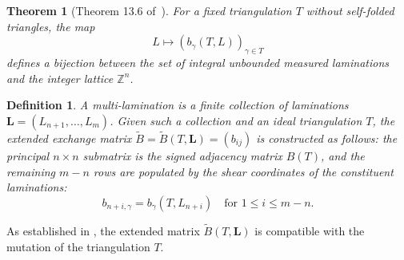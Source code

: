 \documentclass{article}
\newtheorem{definition}{Definition}
\newtheorem{theorem}{Theorem}
\theoremstyle{remark}
\begin{document}
\begin{theorem}[Theorem 13.6 of~\cite{FT-II}]
For a fixed triangulation $T$ without self-folded triangles, the map 
\[ L \mapsto (b_{\gamma}(T, L))_{\gamma \in T} \]
defines a bijection between the set of integral unbounded measured laminations and the integer lattice $\mathbb{Z}^n$.
\end{theorem}

\begin{definition}
A \emph{multi-lamination} is a finite collection of laminations $\mathbf{L} = (L_{n+1}, \ldots, L_{m})$. Given such a collection and an ideal triangulation $T$, the extended exchange matrix $\tilde{B} = \tilde{B}(T, \mathbf{L}) = (b_{ij})$ is constructed as follows: the principal $n \times n$ submatrix is the signed adjacency matrix $B(T)$, and the remaining $m-n$ rows are populated by the shear coordinates of the constituent laminations:
\[
b_{n+i, \gamma} = b_{\gamma}(T, L_{n+i}) \quad \text{for } 1 \leq i \leq m-n.
\]
\end{definition}

As established in \cite{FT-II}, the extended matrix $\tilde{B}(T, \mathbf{L})$ is compatible with the mutation of the triangulation $T$.
\end{document}
